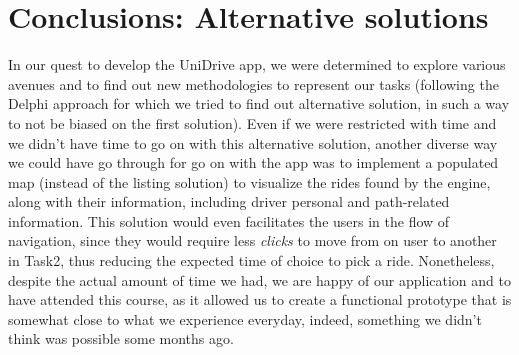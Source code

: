 \documentclass{article}
\begin{document}
\section{Conclusions: Alternative solutions}
In our quest to develop the UniDrive app, we were determined to explore various avenues and to find out new methodologies to represent our tasks (following the Delphi approach for which we tried to find out alternative solution, in such a way to not be biased on the first solution). Even if we were restricted with time and we didn't have time to go on with this alternative solution, another  diverse way we could have go through for go on with the app was to implement a populated map (instead of the listing solution) to visualize the rides found by the engine, along with their information, including driver personal and path-related information. This solution would even facilitates the users in the flow of navigation, since they would require less \textit{clicks} to move from on user to another in Task2, thus reducing the expected time of choice to pick a ride. Nonetheless, despite the actual amount of time we had, we are happy of our application and to have attended this course, as it allowed us to create a functional prototype that is somewhat close to what we experience everyday, indeed, something we didn't think was possible some months ago.
\end{document}

